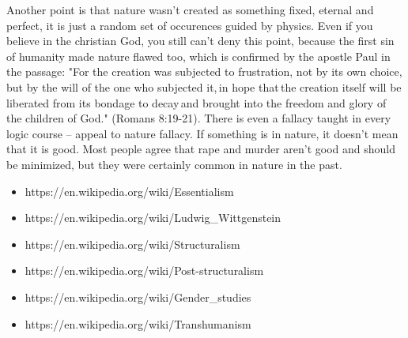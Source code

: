 \documentclass[12 pt, a4paper]{article}
\begin{document}
Another point is that nature wasn't created as something fixed, eternal and perfect, it is just a random set of occurences guided by physics. Even if you believe in the christian God, you still can't deny this point, because the first sin of humanity made nature flawed too, which is confirmed by the apostle Paul in the passage: "For the creation was subjected to frustration, not by its own choice, but by the will of the one who subjected it, in hope that the creation itself will be liberated from its bondage to decay and brought into the freedom and glory of the children of God." (Romans 8:19-21). There is even a fallacy taught in every logic course – appeal to nature fallacy. If something is in nature, it doesn't mean that it is good. Most people agree that rape and murder aren't good and should be minimized, but they were certainly common in nature in the past. 

\begin{itemize}
    \item https://en.wikipedia.org/wiki/Essentialism 
    \item https://en.wikipedia.org/wiki/Ludwig\_Wittgenstein 
    \item https://en.wikipedia.org/wiki/Structuralism 
    \item https://en.wikipedia.org/wiki/Post-structuralism 
    \item https://en.wikipedia.org/wiki/Gender\_studies 
    \item https://en.wikipedia.org/wiki/Transhumanism 
\end{itemize}
\end{document}
